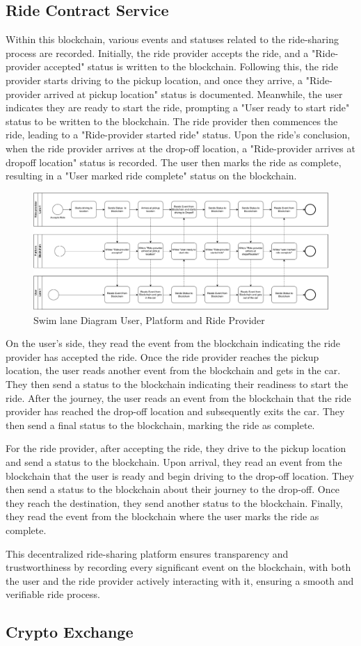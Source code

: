 \subsection{Ride Contract Service}

Within this blockchain, various events and statuses related to the ride-sharing process are recorded. Initially, the ride provider accepts the ride, and a "Ride-provider accepted" status is written to the blockchain. Following this, the ride provider starts driving to the pickup location, and once they arrive, a "Ride-provider arrived at pickup location" status is documented. Meanwhile, the user indicates they are ready to start the ride, prompting a "User ready to start ride" status to be written to the blockchain. The ride provider then commences the ride, leading to a "Ride-provider started ride" status. Upon the ride's conclusion, when the ride provider arrives at the drop-off location, a "Ride-provider arrives at dropoff location" status is recorded. The user then marks the ride as complete, resulting in a "User marked ride complete" status on the blockchain.

\begin{figure}[h]
    \centering
    \includegraphics[width=\linewidth]{data/1.svg}
    \caption{Swim lane Diagram User, Platform and Ride Provider}
    \label{fig:directSVG}
\end{figure}

On the user's side, they read the event from the blockchain indicating the ride provider has accepted the ride. Once the ride provider reaches the pickup location, the user reads another event from the blockchain and gets in the car. They then send a status to the blockchain indicating their readiness to start the ride. After the journey, the user reads an event from the blockchain that the ride provider has reached the drop-off location and subsequently exits the car. They then send a final status to the blockchain, marking the ride as complete.

For the ride provider, after accepting the ride, they drive to the pickup location and send a status to the blockchain. Upon arrival, they read an event from the blockchain that the user is ready and begin driving to the drop-off location. They then send a status to the blockchain about their journey to the drop-off. Once they reach the destination, they send another status to the blockchain. Finally, they read the event from the blockchain where the user marks the ride as complete.

This decentralized ride-sharing platform ensures transparency and trustworthiness by recording every significant event on the blockchain, with both the user and the ride provider actively interacting with it, ensuring a smooth and verifiable ride process.


\subsection{Crypto Exchange}
